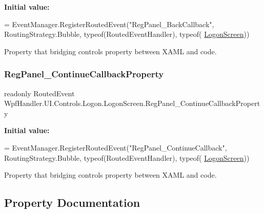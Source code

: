 {\bfseries Initial value\+:}
\begin{DoxyCode}
= EventManager.RegisterRoutedEvent(\textcolor{stringliteral}{"RegPanel\_BackCallback"},
            RoutingStrategy.Bubble, typeof(RoutedEventHandler), typeof(
      \mbox{\hyperlink{class_wpf_handler_1_1_u_i_1_1_controls_1_1_logon_1_1_logon_screen_aa74e0f26e834f7bf226796df3ea1bdfa}{LogonScreen}}))
\end{DoxyCode}


Property that bridging control\textquotesingle{}s property between X\+A\+ML and code. 

\mbox{\label{class_wpf_handler_1_1_u_i_1_1_controls_1_1_logon_1_1_logon_screen_ae158e17e86546c10faa2e157b301c314}} 
\subsubsection{\texorpdfstring{Reg\+Panel\+\_\+\+Continue\+Callback\+Property}{RegPanel\_ContinueCallbackProperty}}
{\footnotesize\ttfamily readonly Routed\+Event Wpf\+Handler.\+U\+I.\+Controls.\+Logon.\+Logon\+Screen.\+Reg\+Panel\+\_\+\+Continue\+Callback\+Property\hspace{0.3cm}{\ttfamily [static]}}

{\bfseries Initial value\+:}
\begin{DoxyCode}
= EventManager.RegisterRoutedEvent(\textcolor{stringliteral}{"RegPanel\_ContinueCallback"},
            RoutingStrategy.Bubble, typeof(RoutedEventHandler), typeof(
      \mbox{\hyperlink{class_wpf_handler_1_1_u_i_1_1_controls_1_1_logon_1_1_logon_screen_aa74e0f26e834f7bf226796df3ea1bdfa}{LogonScreen}}))
\end{DoxyCode}


Property that bridging control\textquotesingle{}s property between X\+A\+ML and code. 



\subsection{Property Documentation}
\mbox{\label{class_wpf_handler_1_1_u_i_1_1_controls_1_1_logon_1_1_logon_screen_a7e4c55e305734514eeedf6b387dad3ea}} 
